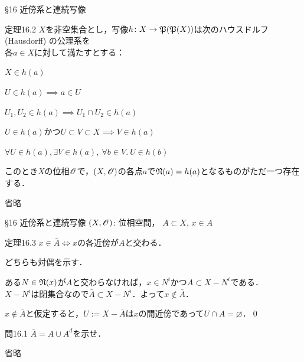 \documentclass[uplatex,a4paper,dvipdfmx,aspectratio=169,11pt]{beamer}
\begin{document}
\begin{frame}[fragile]{\S 16 近傍系と連続写像}
    \begin{block}{定理16.2}
        $X$を非空集合とし，写像$h \colon X \to \mathord{\mathfrak{P}}\qty(\mathord{\mathfrak{P}}\qty(X))$は次の\alert{ハウスドルフ} (Hausdorff) \alert{の公理系}を\\各$a \in X$に対して満たすとする：
        \begin{description}[$\textbf{K}_{1.5}$:]
            \item[$\textbf{H}_1$:] $X \in h(a)$
            \item[$\textbf{H}_{1.5}$:] $U \in h(a) \implies a \in U$
            \item[$\textbf{H}_2$:] $U_1, U_2 \in h(a) \implies U_1 \cap U_2 \in h(a)$
            \item[$\textbf{H}_3$:] $U \in h(a)$かつ$U \subset V \subset X \implies V \in h(a)$
            \item[$\textbf{H}_4$:] $\forall U \in h(a), \exists V \in h(a),\ \forall b \in V.\ U \in h(b)$
        \end{description}

        \medskip{}

        このとき$X$の位相$\mathscr{O}$で，$(X, \mathscr{O})$の各点$a$で$\mathord{\mathfrak{N}}\qty(a) = h(a)$となるものがただ一つ存在する．
    \end{block}

    \medskip{}

     \quad 省略
\end{frame}

\begin{frame}[fragile]{\S 16 近傍系と連続写像}
    $(X, \mathscr{O})$: 位相空間， \quad $A \subset X$, \quad $x \in A$
    \begin{block}{定理16.3}
        $x \in \bar A \iff x$の各近傍が$A$と交わる．
    \end{block}

    \medskip{}

     \quad どちらも対偶を示す．
    \medskip{}
    \begin{description}[($\Rightarrow$)]
        \item[($\Rightarrow$)] ある$N \in \mathord{\mathfrak{N}}\qty(x)$が$A$と交わらなければ，$x \in N^i$かつ$A \subset X - N^i$である．\\
            $X - N^i$は閉集合なので$\bar A \subset X - N^i$．よって$x \notin \bar A$．
        \item[($\Leftarrow$)] $x \notin \bar A$と仮定すると，$U := X - \bar A$は$x$の開近傍であって$U \cap A = \varnothing$．\qed
    \end{description}

    \begin{exampleblock}{問16.1}
        $\bar A = A \cup A^d$を示せ．
    \end{exampleblock}
     \quad 省略
\end{frame}
\end{document}
